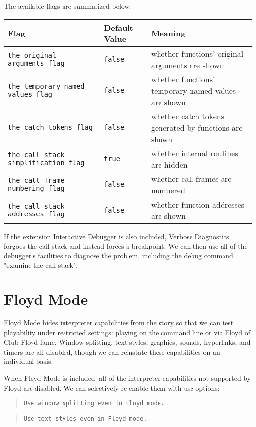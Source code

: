 \documentclass{book}
\newcommand{\impatiencechapter}[1]{\chapter{#1}\addcontentsline{toi}{chapter}{#1}}
\begin{document}
\begin{quote}
  
\end{quote}

The available flags are summarized below:

\hbox{}
\begin{longtable}{llp{6cm}}
  \midrule
  \textbf{Flag}&\textbf{Default Value}&\textbf{Meaning}\\
  \midrule
  \texttt{the original arguments flag}&\texttt{false}&whether functions' original arguments are shown\\
  \texttt{the temporary named values flag}&\texttt{false}&whether functions' temporary named values are shown\\
  \texttt{the catch tokens flag}&\texttt{false}&whether catch tokens generated by functions are shown\\
  \texttt{the call stack simplification flag}&\texttt{true}&whether internal routines are hidden\\
  \texttt{the call frame numbering flag}&\texttt{false}&whether call frames are numbered\\
  \texttt{the call stack addresses flag}&\texttt{false}&whether function addresses are shown\\
  \midrule
\end{longtable}

If the extension Interactive Debugger is also included, Verbose Diagnostics
forgoes the call stack and instead forces a breakpoint.  We can then use all of
the debugger's facilities to diagnose the problem, including the debug command
"examine the call stack".

\impatiencechapter{Floyd Mode}
\label{floyd-mode}

Floyd Mode hides interpreter capabilities from the story so that we can test
playability under restricted settings: playing on the command line or via Floyd
of Club Floyd fame.  Window splitting, text styles, graphics, sounds,
hyperlinks, and timers are all disabled, though we can reinstate these
capabilities on an individual basis.

When Floyd Mode is included, all of the interpreter capabilities not supported
by Floyd are disabled.  We can selectively re-enable them with use options:

\begin{quote}
  \lstinline @Use window splitting even in Floyd mode.@
\end{quote}

\begin{quote}
  \lstinline @Use text styles even in Floyd mode.@
\end{quote}
\end{document}
